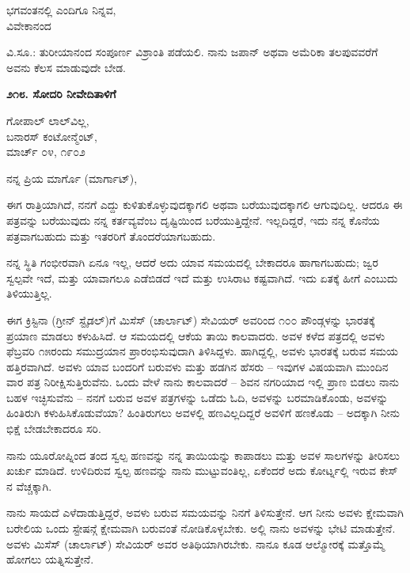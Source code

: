\begin{flushright}
ಭಗವಂತನಲ್ಲಿ ಎಂದಿಗೂ ನಿನ್ನವ,\\ವಿವೇಕಾನಂದ
\end{flushright}

ವಿ.ಸೂ.: ತುರೀಯಾನಂದ ಸಂಪೂರ್ಣ ವಿಶ್ರಾಂತಿ ಪಡೆಯಲಿ. ನಾನು ಜಪಾನ್ ಅಥವಾ ಅಮೆರಿಕಾ ತಲಪುವವರೆಗೆ ಅವನು ಕೆಲಸ ಮಾಡುವುದೇ ಬೇಡ.

\begin{center}
\textbf{೨೧೮. ಸೋದರಿ ನೀವೇದಿತಾಳಿಗೆ}
\end{center}

\begin{flushright}
ಗೋಪಾಲ್ ಲಾಲ್‌ವಿಲ್ಲ,\\ಬನಾರಸ್ ಕಂಟೋನ್ಮೆಂಟ್,\\ಮಾರ್ಚ್ ೦೪, ೧೯೦೨
\end{flushright}

ನನ್ನ ಪ್ರಿಯ ಮಾರ್ಗೊ (ಮಾರ್ಗಾಟ್),

ಈಗ ರಾತ್ರಿಯಾಗಿದೆ, ನನಗೆ ಎದ್ದು ಕುಳಿತುಕೊಳ್ಳುವುದಕ್ಕಾಗಲಿ ಅಥವಾ ಬರೆಯುವುದಕ್ಕಾಗಲಿ ಆಗುವುದಿಲ್ಲ. ಆದರೂ ಈ ಪತ್ರವನ್ನು ಬರೆಯುವುದು ನನ್ನ ಕರ್ತವ್ಯವೆಂಬ ದೃಷ್ಟಿಯಿಂದ ಬರೆಯುತ್ತಿದ್ದೇನೆ. ಇಲ್ಲದಿದ್ದರೆ, ಇದು ನನ್ನ ಕೊನೆಯ ಪತ್ರವಾಗಬಹುದು ಮತ್ತು ಇತರರಿಗೆ ತೊಂದರೆಯಾಗಬಹುದು.

ನನ್ನ ಸ್ಥಿತಿ ಗಂಭೀರವಾಗಿ ಏನೂ ಇಲ್ಲ, ಆದರೆ ಅದು ಯಾವ ಸಮಯದಲ್ಲಿ ಬೇಕಾದರೂ ಹಾಗಾಗಬಹುದು; ಜ್ವರ ಸ್ವಲ್ಪವೇ ಇದೆ, ಮತ್ತು ಯಾವಾಗಲೂ ಎಡೆಬಿಡದೆ ಇದೆ ಮತ್ತು ಉಸಿರಾಟ ಕಷ್ಟವಾಗಿದೆ. ಇದು ಏತಕ್ಕೆ ಹೀಗೆ ಎಂಬುದು ತಿಳಿಯುತ್ತಿಲ್ಲ.

ಈಗ ಕ್ರಿಸ್ಟಿನಾ (ಗ್ರೀನ್ ಸ್ಟೈಡಲ್)ಗೆ ಮಿಸೆಸ್ (ಚಾರ್ಲಾಟ್) ಸೇವಿಯರ್ ಅವರಿಂದ ೧೦೦ ಪೌಂಡ್ಗಳನ್ನು ಭಾರತಕ್ಕೆ ಪ್ರಯಾಣ ಮಾಡಲು ಕಳುಹಿಸಿದೆ. ಆ ಸಮಯದಲ್ಲಿ ಆಕೆಯ ತಾಯಿ ಕಾಲವಾದರು. ಅವಳ ಕಳೆದ ಪತ್ರದಲ್ಲಿ ಅವಳು ಫೆಬ್ರವರಿ ೧೫ರಂದು ಸಮುದ್ರಯಾನ ಪ್ರಾರಂಭಿಸುವುದಾಗಿ ತಿಳಿಸಿದ್ದಳು. ಹಾಗಿದ್ದಲ್ಲಿ, ಅವಳು ಭಾರತಕ್ಕೆ ಬರುವ ಸಮಯ ಹತ್ತಿರವಾಗಿದೆ. ಅವಳು ಯಾವ ಬಂದರಿಗೆ ಬರುವಳು ಮತ್ತು ಹಡಗಿನ ಹೆಸರು – ಇವುಗಳ ವಿಷಯವಾಗಿ ಮುಂದಿನ ವಾರ ಪತ್ರ ನಿರೀಕ್ಷಿಸುತ್ತಿರುವೆನು. ಒಂದು ವೇಳೆ ನಾನು ಕಾಲವಾದರೆ – ಶಿವನ ನಗರಿಯಾದ ಇಲ್ಲಿ ಪ್ರಾಣ ಬಿಡಲು ನಾನು ಬಹಳ ಇಚ್ಛಿಸುವೆನು – ನನಗೆ ಬರುವ ಅವಳ ಪತ್ರಗಳನ್ನು ಒಡೆದು ಓದಿ, ಅವಳನ್ನು ಬರಮಾಡಿಕೊಂಡು, ಅವಳನ್ನು ಹಿಂತಿರುಗಿ ಕಳುಹಿಸಿಕೊಡುವೆಯಾ? ಹಿಂತಿರುಗಲು ಅವಳಲ್ಲಿ ಹಣವಿಲ್ಲದಿದ್ದರೆ ಅವಳಿಗೆ ಹಣಕೊಡು – ಅದಕ್ಕಾಗಿ ನೀನು ಭಿಕ್ಷೆ ಬೇಡಬೇಕಾದರೂ ಸರಿ.

ನಾನು ಯೂರೋಪ್ನಿಂದ ತಂದ ಸ್ವಲ್ಪ ಹಣವನ್ನು ನನ್ನ ತಾಯಿಯನ್ನು ಕಾಪಾಡಲು ಮತ್ತು ಅವಳ ಸಾಲಗಳನ್ನು ತೀರಿಸಲು ಖರ್ಚು ಮಾಡಿದೆ. ಉಳಿದಿರುವ ಸ್ವಲ್ಪ ಹಣವನ್ನು ನಾನು ಮುಟ್ಟುವಂತಿಲ್ಲ, ಏಕೆಂದರೆ ಅದು ಕೋರ್ಟ್ನಲ್ಲಿ ಇರುವ ಕೇಸ್ ನ ವೆಚ್ಚಕ್ಕಾಗಿ.

ನಾನು ಸಾಯದೆ ಎಳೆದಾಡುತ್ತಿದ್ದರೆ, ಅವಳು ಬರುವ ಸಮಯವನ್ನು ನಿನಗೆ ತಿಳಿಸುತ್ತೇನೆ. ಆಗ ನೀನು ಅವಳು ಕ್ಷೇಮವಾಗಿ ಬರೇಲಿಯ ಒಂದು ಸ್ಟೇಷನ್ಗೆ ಕ್ಷೇಮವಾಗಿ ಬರುವಂತೆ ನೋಡಿಕೊಳ್ಳಬೇಕು. ಅಲ್ಲಿ ನಾನು ಅವಳನ್ನು ಭೇಟಿ ಮಾಡುತ್ತೇನೆ. ಅವಳು ಮಿಸೆಸ್ (ಚಾರ್ಲಾಟ್) ಸೇವಿಯರ್ ಅವರ ಅತಿಥಿಯಾಗಿರಬೇಕು. ನಾನೂ ಕೂಡ ಆಲ್ಮೋರಕ್ಕೆ ಮತ್ತೊಮ್ಮೆ ಹೋಗಲು ಯತ್ನಿಸುತ್ತೇನೆ.


